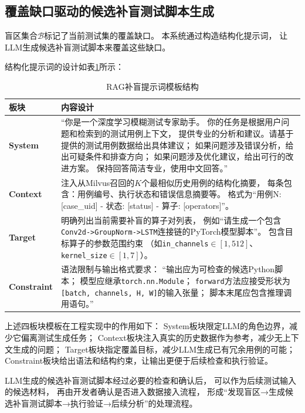\subsection{覆盖缺口驱动的候选补盲测试脚本生成}

盲区集合$\mathcal{B}$标记了当前测试集的覆盖缺口。
本系统通过构造结构化提示词，
让LLM生成候选补盲测试脚本来覆盖这些缺口。

结构化提示词的设计如表\ref{tab:prompt_template}所示：

\begin{table}[htbp]
\centering
\caption{RAG补盲提示词模板结构}
\label{tab:prompt_template}
\begin{tabular}{lp{10cm}}
\toprule
板块 & 内容设计 \\
\midrule
\textbf{System} &
“你是一个深度学习模糊测试专家助手。\allowbreak{}
你的任务是根据用户问题和检索到的测试用例上下文，\allowbreak{}
提供专业的分析和建议。请基于提供的测试用例数据给出具体建议；\allowbreak{}
如果问题涉及错误分析，给出可疑条件和排查方向；\allowbreak{}
如果问题涉及优化建议，给出可行的改进方案。\allowbreak{}
保持回答简洁专业，使用中文回答。” \\
\midrule
\textbf{Context} &
注入从Milvus召回的$K$个最相似历史用例的结构化摘要，
每条包含：用例编号、执行状态和错误信息摘要等。
格式为“用例N: [case\_uid] - 状态: [status] -
算子: [operators]”。\\
\midrule
\textbf{Target} &
明确列出当前需要补盲的算子对列表，
例如“请生成一个包含\allowbreak{}\texttt{Conv2d->}\allowbreak\texttt{GroupNorm->LSTM}\allowbreak{}连接链的PyTorch模型脚本”。
包含目标算子的参数范围约束
（如\texttt{in\_channels}$\in [1, 512]$、\allowbreak{}%
\texttt{kernel\_size}$\in [1, 7]$）。\\
\midrule
\textbf{Constraint} &
语法限制与输出格式要求：
“输出应为可检查的候选Python脚本；
模型应继承\texttt{torch.nn.Module}；\allowbreak{}
\texttt{forward}方法应接受形状为\allowbreak{}%
\texttt{[batch, channels, H, W]}的输入张量；
脚本末尾应包含推理调用语句。”\\
\bottomrule
\end{tabular}
\end{table}

上述四板块模板在工程实现中的作用如下：
System板块限定LLM的角色边界，减少它偏离测试生成任务；
Context板块注入真实的历史数据作为参考，减少无上下文生成的问题；
Target板块指定覆盖目标，减少LLM生成已有冗余用例的可能；
Constraint板块给出语法和结构约束，让输出更便于后续检查和执行验证。

LLM生成的候选补盲测试脚本经过必要的检查和确认后，
可以作为后续测试输入的候选材料，
再由开发者确认是否进入数据接入流程，
形成“发现盲区→生成候选补盲测试脚本→执行验证→后续分析”的处理流程。

